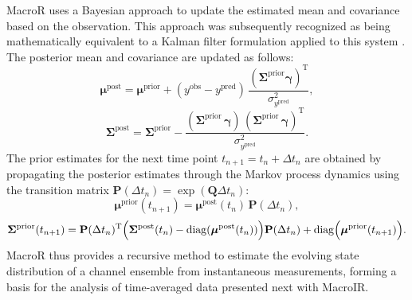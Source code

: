 \documentclass[9pt]{elife}
\begin{document}
	MacroR uses a Bayesian approach to update the estimated mean and covariance based on the observation. This approach was subsequently recognized as being mathematically equivalent to a Kalman filter formulation applied to this system \cite{stepanyuk2011efficient}. The posterior mean and covariance are updated as follows:
	\begin{equation}
		\boldsymbol{\mu}^{\text{post}} = \boldsymbol{\mu}^{\text{prior}} + (y^{\text{obs}} - y^{\text{pred}})\, \frac{(\boldsymbol{\Sigma}^{\text{prior}} \boldsymbol{\gamma})^{\mathrm{T}}}{\sigma^2_{y^{\text{pred}}}},
		\label{eq:macro_mean_posterior} %
	\end{equation}
	\begin{equation}
		\boldsymbol{\Sigma}^{\text{post}} = \boldsymbol{\Sigma}^{\text{prior}} - \frac{(\boldsymbol{\Sigma}^{\text{prior}}\, \boldsymbol{\gamma})\, (\boldsymbol{\Sigma}^{\text{prior}}\, \boldsymbol{\gamma})^{\mathrm{T}}}{\sigma^2_{y^{\text{pred}}}}.
		\label{eq:macro_cov_posterior} %
	\end{equation}
	The prior estimates for the next time point \( t_{n+1} = t_n + \Delta t_n \) are obtained by propagating the posterior estimates through the Markov process dynamics using the transition matrix \( \mathbf{P}(\Delta t_n) = \exp(\boldsymbol{Q}\Delta t_n) \):
	\begin{equation}
		\boldsymbol{\mu}^{\text{prior}}(t_{n+1}) = \boldsymbol{\mu}^{\text{post}}(t_n)\, \mathbf{P}(\Delta t_n),
		\label{eq:macro_mean_next_prior}
	\end{equation}
	\begin{equation}
		\boldsymbol{\Sigma}^{\text{prior}}(t_{n+1}) = \mathbf{P}(\Delta t_n)^{\mathrm{T}} \Bigl( \boldsymbol{\Sigma}^{\text{post}}(t_n) - \mathrm{diag}(\boldsymbol{\mu}^{\text{post}}(t_n)) \Bigr) \mathbf{P}(\Delta t_n) + \mathrm{diag}\Bigl(\boldsymbol{\mu}^{\text{prior}}(t_{n+1})\Bigr).
		\label{eq:macro_mean_next_cov} %
	\end{equation}
	MacroR thus provides a recursive method to estimate the evolving state distribution of a channel ensemble from instantaneous measurements, forming a basis for the analysis of time-averaged data presented next with MacroIR.
	
\end{document}
